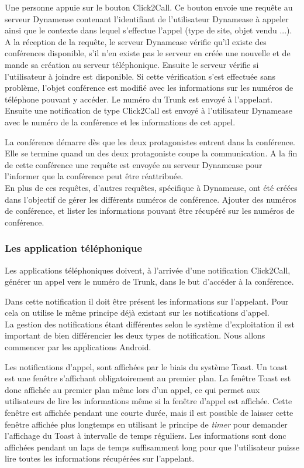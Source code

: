Une personne appuie sur le bouton Click2Call. Ce bouton envoie une requête au serveur Dynamease contenant l'identifiant de l'utilisateur Dynamease à appeler ainsi que le contexte dans lequel s'effectue l'appel (type de site, objet vendu ...). A la réception de la requête, le serveur Dynamease vérifie qu'il existe des conférences disponible, s'il n'en existe pas le serveur en créée une nouvelle et de mande sa création au serveur téléphonique. Ensuite le serveur vérifie si l'utilisateur à joindre est disponible. Si cette vérification s'est effectuée sans problème, l'objet conférence est modifié avec les informations sur les numéros de téléphone pouvant y accéder. Le numéro du Trunk est envoyé à l'appelant. Ensuite une notification de type Click2Call est envoyé à l'utilisateur Dynamease avec le numéro de la conférence et les informations de cet appel.

La conférence démarre dès que les deux protagonistes entrent dans la conférence. Elle se termine quand un des deux protagoniste coupe la communication. A la fin de cette conférence une requête est envoyée au serveur Dynamease pour l'informer que la conférence peut être réattribuée.\\

En plus de ces requêtes, d'autres requêtes, spécifique à Dynamease, ont été créées dans l'objectif de gérer les différents numéros de conférence. Ajouter des numéros de conférence, et lister les informations pouvant être récupéré  sur les numéros de conférence.

\subsubsection{Les application téléphonique} 

Les applications téléphoniques doivent, à l'arrivée d'une notification Click2Call, générer un appel vers le numéro de Trunk, dans le but d'accéder à la conférence.

Dans cette notification il doit être présent les informations sur l'appelant. Pour cela on utilise le même principe déjà existant sur les notifications d'appel.\\

La gestion des notifications étant différentes selon le système d'exploitation il est important de bien différencier les deux types de notification. Nous allons commencer par les applications Android.

Les notifications d'appel, sont affichées par le biais du système Toast. Un toast est une fenêtre s'affichant obligatoirement au premier plan. La fenêtre Toast est donc affichée au premier plan même lors d'un appel, ce qui permet aux utilisateurs de lire les informations même si la fenêtre d'appel est affichée. Cette fenêtre est affichée pendant une courte durée, mais il est possible de laisser cette fenêtre affichée plus longtemps en utilisant le principe de \textit{timer} pour demander l'affichage du Toast à intervalle de temps réguliers. Les informations sont donc affichées pendant un laps de temps suffisamment long pour que l'utilisateur puisse lire toutes les informations récupérées sur l'appelant.

